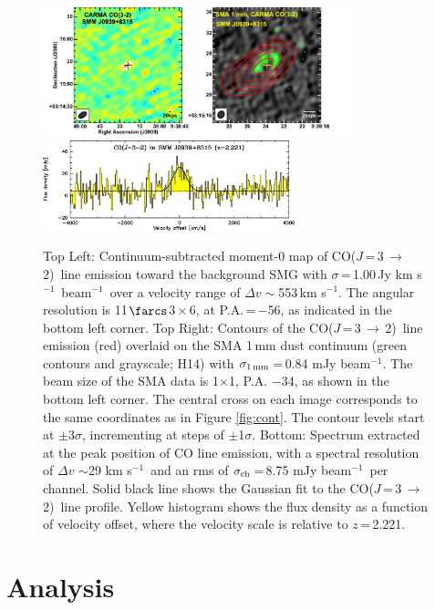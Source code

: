 \documentclass[twocolumn,apj,numberedappendix]{emulateapj}
\newcommand{\CO}{\mbox{CO($J$\,=\,3\,$\rightarrow$\,2) }}
\newcommand{\pmOne}{\mbox{$^{-1}$}}
\begin{document}
\begin{figure}[tbph] 
\centering
\includegraphics[width=0.8\textwidth]{Figure/LinePanel.pdf}
\includegraphics[width=0.65\textwidth]{Figure/smmj0939-co32_spec.eps}
\caption{Top Left: Continuum-subtracted moment-0 map of \CO line emission toward 
the background SMG with $\sigma$\,=\,1.00\,Jy\,\,km\,\,s\pmOne\ beam\pmOne\ over a velocity range of $\Delta v\sim$553\,km\,\,s\pmOne. The angular resolution is 11$\farcs$3\,$\times$\,6, at P.A.\,=\,$-$56\degr, as indicated in the bottom left corner. 
Top Right: Contours of the \CO line emission (red) overlaid on the SMA 1\,mm dust continuum (green contours and grayscale; H14) with $\sigma_{\rm 1\,mm}$\,=\,0.84 mJy beam\pmOne. The beam size of the SMA data is 1$ \times $1, P.A. $-$34\degr, as shown 
in the bottom left corner. 
The central cross on each image corresponds to the same coordinates as in Figure \ref{fig:cont}. The contour levels start at $\pm$3$\sigma$, incrementing at
steps of $\pm$1$\sigma$. 
Bottom: 
Spectrum extracted at the peak position of CO line emission, with a spectral resolution of $\Delta v$ $\sim$29 km\,\,s\pmOne\, and an rms of $\sigma_{\rm ch}$\,=\,8.75 mJy beam\pmOne\ per channel.
Solid black line shows the Gaussian fit to the \CO line profile. Yellow histogram shows the 
flux density as a function of velocity offset, where the velocity scale is relative to $z$\,=\,2.221. 
\label{fig:mom0}}
\end{figure}


\section{Analysis}
\end{document}

